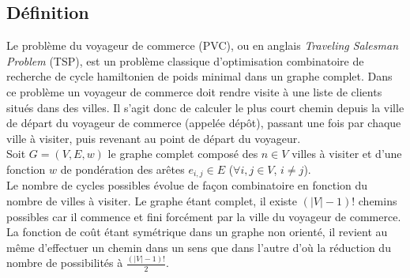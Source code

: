 \label{sec:tsp}

\subsection{Définition}
\label{sec:tsp:definition}

Le problème du voyageur de commerce (PVC), ou en anglais \textit{Traveling Salesman Problem} (TSP), est un problème classique d'optimisation combinatoire de recherche de cycle hamiltonien de poids minimal dans un graphe complet.
Dans ce problème un voyageur de commerce doit rendre visite à une liste de clients situés dans des villes.
Il s'agit donc de calculer le plus court chemin depuis la ville de départ du voyageur de commerce (appelée dépôt), passant une fois par chaque ville à visiter, puis revenant au point de départ du voyageur.\\

Soit $G = (V,E,w)$ le graphe complet composé des $n \in V$ villes à visiter et d'une fonction $w$ de pondération des arêtes $e_{i,j} \in E$ ($\forall i,j \in V$, $i \neq j$).\\

Le nombre de cycles possibles évolue de façon combinatoire en fonction du nombre de villes à visiter. Le graphe étant complet, il existe $(|V|-1)!$ chemins possibles car il commence et fini forcément par la ville du voyageur de commerce. La fonction de coût étant symétrique dans un graphe non orienté, il revient au même d'effectuer un chemin dans un sens que dans l'autre d'où la réduction du nombre de possibilités à $\frac{(|V|-1)!}{2}$.\\

